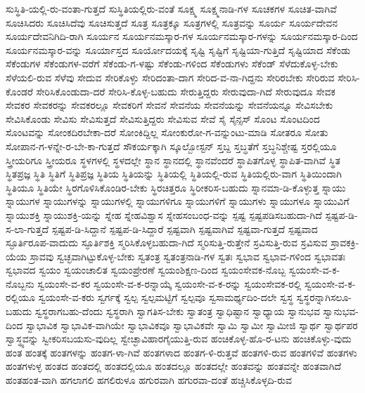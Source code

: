 {ಸುಸ್ಥಿತಿ-ಯಲ್ಲಿ-ರು-ವಂತಾ-ಗುತ್ತದೆ
ಸುಸ್ಥಿತಿಯಲ್ಲಿರು-ವಂತೆ
ಸೂಕ್ಷ್ಮ
ಸೂಕ್ಷ್ಮನಾಡಿ-ಗಳ
ಸೂಚಕಗಳ
ಸೂಚಿತ-ವಾಗಿವೆ
ಸೂಚಿಸಿದರು
ಸೂಚಿಸಿದೆವು
ಸೂಚಿಸುತ್ತದೆ
ಸೂತ್ರ
ಸೂತ್ರಕ್ಕೂ
ಸೂತ್ರಗಳಲ್ಲಿ
ಸೂತ್ರವನ್ನು
ಸೂರ್ಯ
ಸೂರ್ಯದೇವನ
ಸೂರ್ಯದೇವನಿಗಿದಿ-ರಾಗಿ
ಸೂರ್ಯನ
ಸೂರ್ಯನಮಸ್ಕಾರ-ಗಳ
ಸೂರ್ಯನಮಸ್ಕಾರ-ಗಳನ್ನು
ಸೂರ್ಯನಮಸ್ಕಾರ-ದಿಂದ
ಸೂರ್ಯನಮಸ್ಕಾರ-ವನ್ನು
ಸೂರ್ಯಾಸ್ತದ
ಸೂರ್ಯೋದಯಕ್ಕೆ
ಸೃಷ್ಟಿ
ಸೃಷ್ಟಿಗೆ
ಸೃಷ್ಟಿಯಾ-ಗುತ್ತಿದೆ
ಸೃಷ್ಟಿಯಾದ
ಸೆಕೆಂಡು
ಸೆಕೆಂಡುಗಳ
ಸೆಕೆಂಡುಗಳ-ವರೆಗೆ
ಸೆಕೆಂಡು-ಗ-ಳಷ್ಟು
ಸೆಕೆಂಡು-ಗಳಿಂದ
ಸೆಕೆಂಡುಗಳು
ಸೆಕೆಂಡ್
ಸೆಳೆದುಕೊಳ್ಳ-ಬೇಕು
ಸೆಳೆಯಲಿ-ರುವ
ಸೆಳೆವು
ಸೇದುವ
ಸೇರಿಕೊಳ್ಳು
ಸೇರಿದಂತಾ-ದಾಗ
ಸೇರಿದ-ವ-ನಾ-ಗಿದ್ದನು
ಸೇರಿರಬೇಕು
ಸೇರಿರುವ
ಸೇರಿಸಿ-ಕೊಂಡರೆ
ಸೇರಿಸಿಕೊಂಡುದಾ-ದರೆ
ಸೇರಿಸಿ-ಕೊಳ್ಳ-ಬಹುದು
ಸೇರುತ್ತಿದ್ದರು
ಸೇರುವುದಾ-ಗಿದೆ
ಸೇರುವುದೂ
ಸೇವಕ
ಸೇವಕರ
ಸೇವಕರನ್ನು
ಸೇವಕರಲ್ಲೂ
ಸೇವಕರಿಗೆ
ಸೇವನೆ
ಸೇವನೆಯ
ಸೇವನೆಯನ್ನು
ಸೇವನೆಯನ್ನೂ
ಸೇವಿಸಬೇಕು
ಸೇವಿಸಿಕೊಂಡು
ಸೇವಿಸು
ಸೇವಿಸುತ್ತದೆ
ಸೇವಿಸುತ್ತಿದ್ದರು
ಸೇವಿಸುವ
ಸೇವೆ
ಸೈ
ಸೈನ್ಸಸ್
ಸೊಂಟ
ಸೊಂಟದಿಂದ
ಸೊಂಟವನ್ನು
ಸೋಂಕದಿರಬೇಕಾ-ದರೆ
ಸೋಂಕಿದ್ದಿಲ್ಲ
ಸೋಂಕುರೋ-ಗ-ವನ್ನುಂಟು-ಮಾಡಿ
ಸೋತರೂ
ಸೋತು
ಸೋಪಾನ-ಗ-ಳನ್ನೇ-ರ-ಬೇ-ಕಾ-ಗುತ್ತದೆ
ಸೌಕರ್ಯಕ್ಕಾಗಿ
ಸ್ಕೂಲ್ಬೋಸ್ಟನ್
ಸ್ತಬ್ದ
ಸ್ತಬ್ಧತೆಗೆ
ಸ್ತಬ್ಧನಿಶ್ಚೇಷ್ಟ
ಸ್ತರಲ್ಲಿಯೂ
ಸ್ತ್ರೀಯರಿಗೂ
ಸ್ತ್ರೀಯರೂ
ಸ್ಥಳಗಳಲ್ಲಿ
ಸ್ಥಳದಲ್ಲೇ
ಸ್ಥಾನ
ಸ್ಥಾನದಲ್ಲಿ
ಸ್ಥಾನವೆಂದರೆ
ಸ್ಥಾಪಿತಗೊಳ್ಳ
ಸ್ಥಾಪಿತ-ವಾಗಿವೆ
ಸ್ಥಿತ
ಸ್ಥಿತಪ್ರಜ್ಞ
ಸ್ಥಿತಿ
ಸ್ಥಿತಿಗೆ
ಸ್ಥಿತಿಪ್ರಜ್ಞ
ಸ್ಥಿತಿಯ
ಸ್ಥಿತಿಯನ್ನು
ಸ್ಥಿತಿಯಲ್ಲಿ
ಸ್ಥಿತಿಯಲ್ಲಿ-ರುವ
ಸ್ಥಿತಿಯಲ್ಲಿರು-ವಾಗ
ಸ್ಥಿತಿಯಿಂದಾಗಿ
ಸ್ಥಿತಿಯೂ
ಸ್ಥಿತಿಯೇ
ಸ್ಥಿರಗೊಳಿಸಿಕೊಂಡಿರ-ಬೇಕು
ಸ್ಥಿರಚಿತ್ತರೂ
ಸ್ಥಿರೀಕರಿಸ-ಬಹುದು
ಸ್ನಾನಮಾ-ಡಿ-ಕೊಳ್ಳುತ್ತ
ಸ್ನಾಯು
ಸ್ನಾಯುಗಳ
ಸ್ನಾಯುಗಳನ್ನು
ಸ್ನಾಯುಗಳಲ್ಲಿ
ಸ್ನಾಯುಗಳಿಗೂ
ಸ್ನಾಯುಗಳಿಗೆ
ಸ್ನಾಯುಗಳು
ಸ್ನಾಯುಗಳೂ
ಸ್ನಾಯುವಿಗೆ
ಸ್ನಾಯುಶಕ್ತಿ
ಸ್ನಾಯುಶಕ್ತಿ-ಯನ್ನು
ಸ್ನೇಹ
ಸ್ನೇಹವಿಶ್ವಾಸ
ಸ್ನೇಹಸಂಬಂಧ-ವನ್ನು
ಸ್ಪಷ್ಟ
ಸ್ಪಷ್ಟಪಡಿಸಬಹುದಾ-ಗಿದೆ
ಸ್ಪಷ್ಟಪ-ಡಿ-ಸ-ಲಾ-ಗುತ್ತದೆ
ಸ್ಪಷ್ಟಪ-ಡಿ-ಸಿದ್ದಾನೆ
ಸ್ಪಷ್ಟಪ-ಡಿ-ಸಿದ್ದಾರೆ
ಸ್ಪಷ್ಟವಾಗಿ
ಸ್ಪಷ್ಟವಾಗಿವೆ
ಸ್ಪಷ್ಟವಾ-ಗುತ್ತದೆ
ಸ್ಪಷ್ಟವಾದ
ಸ್ಫೂರ್ತಿರೂಪ-ವಾದುದು
ಸ್ಫೂರ್ತಿಶಕ್ತಿ
ಸ್ಮರಿಸಿಕೊಳ್ಳಬಹುದಾ-ಗಿದೆ
ಸ್ಮರಿಸುತ್ತಿ-ರುತ್ತೇನೆ
ಸ್ರವಿಸುತ್ತಿ-ರುವ
ಸ್ರವಿಸುವ
ಸ್ರಾವಕಕ್ರಿ-ಯೆಯ
ಸ್ರಾವವು
ಸ್ವಚ್ಛವಾಗಿಟ್ಟುಕೊಳ್ಳ-ಬೇಕು
ಸ್ವತಂತ್ರ
ಸ್ವತಂತ್ರನಾಡಿ-ಗಳ
ಸ್ವತಃ
ಸ್ವಭಾವ
ಸ್ವಭಾವ-ಗಳಿಂದ
ಸ್ವಭಾವತಃ
ಸ್ವಭಾವದ
ಸ್ವಯಂ
ಸ್ವಯಂಚಾಲಿತ
ಸ್ವಯಂಪ್ರೇರಣೆ
ಸ್ವಯಂಶಿಕ್ಷಣ-ದಿಂದ
ಸ್ವಯಂಸೇವಕ-ನೊಬ್ಬ
ಸ್ವಯಂಸೇ-ವ-ಕ-ನೊಬ್ಬನು
ಸ್ವಯಂಸೇ-ವ-ಕರ
ಸ್ವಯಂಸೇ-ವ-ಕ-ರನ್ನಾಯ್ಕೆ
ಸ್ವಯಂಸೇ-ವ-ಕ-ರನ್ನು
ಸ್ವಯಂಸೇವಕ-ರಲ್ಲಿ
ಸ್ವಯಂಸೇ-ವ-ಕ-ರಲ್ಲಿಯೂ
ಸ್ವಯಂಸೇ-ವ-ಕರು
ಸ್ವರ್ಗಕ್ಕೆ
ಸ್ವಲ್ಪ
ಸ್ವಲ್ಪಮಟ್ಟಿಗೆ
ಸ್ವಲ್ಪವೂ
ಸ್ವಸಾಮರ್ಥ್ಯದಿಂ-ದಲೇ
ಸ್ವಸ್ಥ
ಸ್ವಸ್ಥರನ್ನಾಗಿಸಲೂ-ಬಹುದು
ಸ್ವಸ್ಥರಾಗಬಹು-ದೆಂದು
ಸ್ವಸ್ಥರಾಗಿ
ಸ್ವಾಗತಿಸ-ಬೇಕು
ಸ್ವಾತಂತ್ರ
ಸ್ವಾಧಿಷ್ಟಾನ
ಸ್ವಾಧ್ಯಾಯ
ಸ್ವಾನುಭವ
ಸ್ವಾನುಭವ-ದಿಂದ
ಸ್ವಾಭಾವಿಕ
ಸ್ವಾಭಾವಿಕ-ವಾಗಿಯೇ
ಸ್ವಾಭಾವಿಕವೂ
ಸ್ವಾಭಾವಿಕವೇ
ಸ್ವಾಮಿ
ಸ್ವಾಮೀ
ಸ್ವಾಮೀಜಿ
ಸ್ವಾರ್ಥ
ಸ್ವಾರ್ಥಪರ
ಸ್ವಾಸ್ಥ್ಯವನ್ನು
ಸ್ವೀಕರಿಸಬಯಸು-ವುದಿಲ್ಲ
ಸ್ವೇಚ್ಛಾವಿಹಾರಗೈಯುತ್ತಿ-ರುವ
ಹಂಚಿಕೊಳ್ಳ-ಹೊ-ರ-ಟನು
ಹಂಚಿಕೊಳ್ಳು-ವುದು
ಹಂತ
ಹಂತಕ್ಕೆ
ಹಂತಗಳನ್ನು
ಹಂತಗ-ಳಾ-ಗಿವೆ
ಹಂತಗಳಾದ
ಹಂತಗ-ಳಿ-ರುತ್ತವೆ
ಹಂತಗಳಿ-ರುವ
ಹಂತಗಳಿವೆ
ಹಂತಗಳು
ಹಂತಗಳುಳ್ಳ
ಹಂತದ
ಹಂತದಲ್ಲಿ
ಹಂತದಲ್ಲಿಯೂ
ಹಂತದಲ್ಲೂ
ಹಂತದಲ್ಲೇ
ಹಂತವನ್ನು
ಹಂತವನ್ನೇ
ಹಂತವಾಗಿದೆ
ಹಂತಹಂತ-ವಾಗಿ
ಹಗಲಾಗಲಿ
ಹಗಲಿರುಳೂ
ಹಗುರವಾಗಿ
ಹಗುರವಾ-ದಂತೆ
ಹಚ್ಚಿಸಿಕೊಳ್ಳದಿ-ರುವ
}
